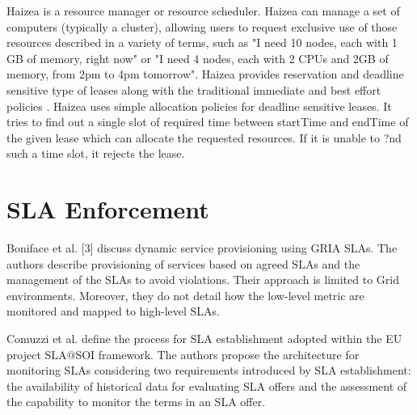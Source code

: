 Haizea \cite{haizea2} is a resource manager or resource scheduler. Haizea  can manage a set of computers (typically a cluster), allowing users to request exclusive use of those resources described in a variety of terms, such as "I need 10 nodes, each with 1 GB of memory, right now" or "I need 4 nodes, each with 2 CPUs and 2GB of memory, from 2pm to 4pm tomorrow". Haizea provides reservation and deadline sensitive type of leases along with the traditional immediate and best effort policies \cite{haizea1} \cite{haizea3} \cite{haizea4}. Haizea uses simple allocation policies for deadline sensitive leases. It tries to find out a single slot of required time between startTime and endTime of the given lease which can allocate the requested resources. If it is unable to ?nd such a time slot, it rejects the lease. 

\section{SLA Enforcement}




Boniface et al. [3] discuss dynamic service provisioning using GRIA SLAs. The authors describe provisioning of services based on agreed SLAs and the management of the SLAs to avoid violations. Their approach is limited to Grid environments. Moreover, they do not detail how the low-level metric are monitored and mapped to high-level SLAs. 

Comuzzi et al. \cite{5175897} define the process for SLA establishment adopted within the EU project SLA@SOI framework. The authors propose the architecture for monitoring SLAs considering two requirements introduced by SLA establishment: the availability of historical data for evaluating SLA offers and the assessment of the capability to monitor the terms in an SLA offer.


